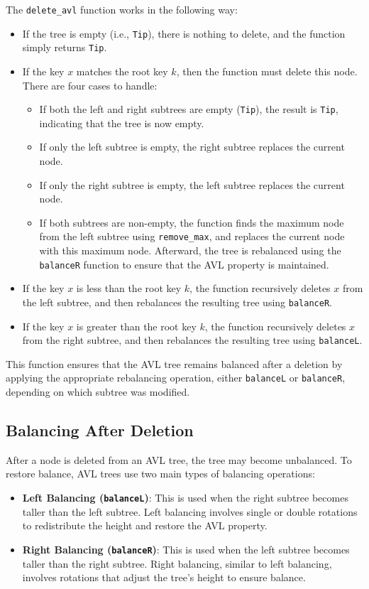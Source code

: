 \documentclass[12pt]{article}
\begin{document}
\begin{itemize}
The \texttt{delete\_avl} function works in the following way:
\begin{itemize}
    \item If the tree is empty (i.e., \texttt{Tip}), there is nothing to delete, and the function simply returns \texttt{Tip}.
    \item If the key \( x \) matches the root key \( k \), then the function must delete this node. There are four cases to handle:
    \begin{itemize}
        \item If both the left and right subtrees are empty (\texttt{Tip}), the result is \texttt{Tip}, indicating that the tree is now empty.
        \item If only the left subtree is empty, the right subtree replaces the current node.
        \item If only the right subtree is empty, the left subtree replaces the current node.
        \item If both subtrees are non-empty, the function finds the maximum node from the left subtree using \texttt{remove\_max}, and replaces the current node with this maximum node. Afterward, the tree is rebalanced using the \texttt{balanceR} function to ensure that the AVL property is maintained.
    \end{itemize}
    \item If the key \( x \) is less than the root key \( k \), the function recursively deletes \( x \) from the left subtree, and then rebalances the resulting tree using \texttt{balanceR}.
    \item If the key \( x \) is greater than the root key \( k \), the function recursively deletes \( x \) from the right subtree, and then rebalances the resulting tree using \texttt{balanceL}.
\end{itemize}

This function ensures that the AVL tree remains balanced after a deletion by applying the appropriate rebalancing operation, either \texttt{balanceL} or \texttt{balanceR}, depending on which subtree was modified.

\subsection*{Balancing After Deletion}

After a node is deleted from an AVL tree, the tree may become unbalanced. To restore balance, AVL trees use two main types of balancing operations:
\begin{itemize}
    \item \textbf{Left Balancing (\texttt{balanceL})}: This is used when the right subtree becomes taller than the left subtree. Left balancing involves single or double rotations to redistribute the height and restore the AVL property.
    \item \textbf{Right Balancing (\texttt{balanceR})}: This is used when the left subtree becomes taller than the right subtree. Right balancing, similar to left balancing, involves rotations that adjust the tree's height to ensure balance.
\end{itemize}


\end{itemize}
\end{document}
